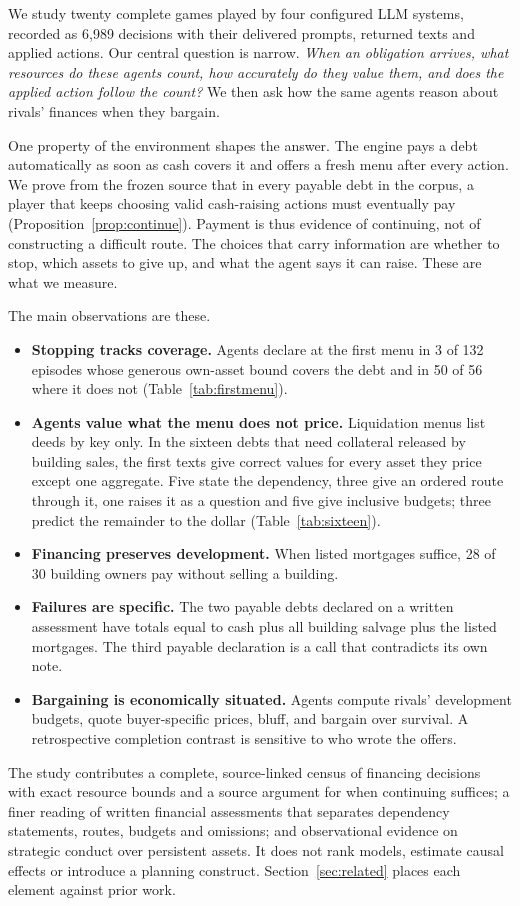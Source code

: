 \documentclass[10pt,twocolumn,letterpaper]{article}
\begin{document}
We study twenty complete games played by four configured LLM systems, recorded as 6,989 decisions with their delivered prompts, returned texts and applied actions. Our central question is narrow. \emph{When an obligation arrives, what resources do these agents count, how accurately do they value them, and does the applied action follow the count?} We then ask how the same agents reason about rivals' finances when they bargain.

One property of the environment shapes the answer. The engine pays a debt automatically as soon as cash covers it and offers a fresh menu after every action. We prove from the frozen source that in every payable debt in the corpus, a player that keeps choosing valid cash-raising actions must eventually pay (Proposition~\ref{prop:continue}). Payment is thus evidence of continuing, not of constructing a difficult route. The choices that carry information are whether to stop, which assets to give up, and what the agent says it can raise. These are what we measure.

The main observations are these.
\begin{itemize}
\item \textbf{Stopping tracks coverage.} Agents declare at the first menu in 3 of 132 episodes whose generous own-asset bound covers the debt and in 50 of 56 where it does not (Table~\ref{tab:firstmenu}).
\item \textbf{Agents value what the menu does not price.} Liquidation menus list deeds by key only. In the sixteen debts that need collateral released by building sales, the first texts give correct values for every asset they price except one aggregate. Five state the dependency, three give an ordered route through it, one raises it as a question and five give inclusive budgets; three predict the remainder to the dollar (Table~\ref{tab:sixteen}).
\item \textbf{Financing preserves development.} When listed mortgages suffice, 28 of 30 building owners pay without selling a building.
\item \textbf{Failures are specific.} The two payable debts declared on a written assessment have totals equal to cash plus all building salvage plus the listed mortgages. The third payable declaration is a call that contradicts its own note.
\item \textbf{Bargaining is economically situated.} Agents compute rivals' development budgets, quote buyer-specific prices, bluff, and bargain over survival. A retrospective completion contrast is sensitive to who wrote the offers.
\end{itemize}
The study contributes a complete, source-linked census of financing decisions with exact resource bounds and a source argument for when continuing suffices; a finer reading of written financial assessments that separates dependency statements, routes, budgets and omissions; and observational evidence on strategic conduct over persistent assets. It does not rank models, estimate causal effects or introduce a planning construct. Section~\ref{sec:related} places each element against prior work.
\end{document}
